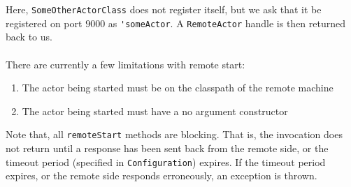 \documentclass{article}
\begin{document}
Here, \verb|SomeOtherActorClass| does not register itself, but we ask that it be registered
on port $9000$ as \verb|'someActor|. A \verb|RemoteActor| handle is then returned back to
us.\\ \\
There are currently a few limitations with remote start:
\begin{enumerate}
  \item The actor being started must be on the classpath of the remote machine
  \item The actor being started must have a no argument constructor
\end{enumerate}
Note that, all \verb|remoteStart| methods are blocking. That is, the invocation does not return
until a response has been sent back from the remote side, or the timeout period
(specified in \verb|Configuration|) expires. If the timeout period expires, or
the remote side responds erroneously, an exception is thrown.
\end{document}
